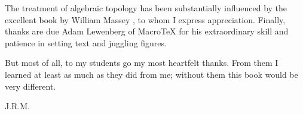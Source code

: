 The treatment of algebraic topology has been substantially influenced by the 
excellent book by William Massey \cite{Massey1990}, to whom I express appreciation. Finally, 
thanks are due Adam Lewenberg of MacroTeX for his extraordinary skill and patience 
in setting text and juggling figures.

But most of all, to my students go my most heartfelt thanks. From them I 
learned at least as much as they did from me; without them this book would be very 
different.

\begin{flushright}
J.R.M.
\end{flushright}
